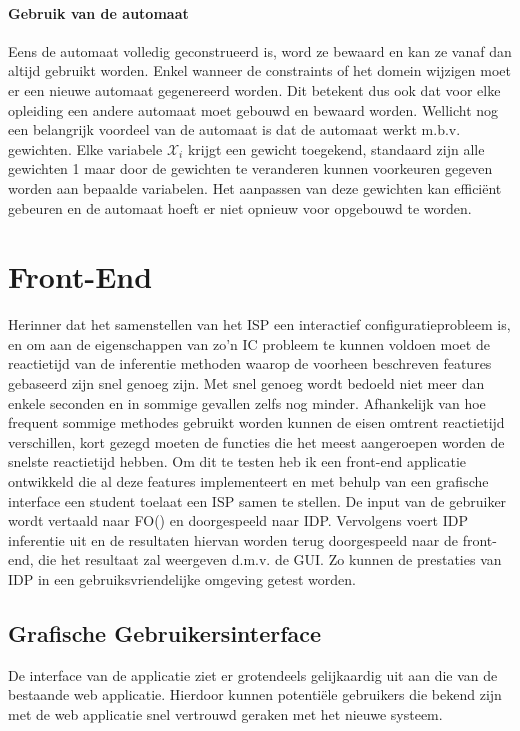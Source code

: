 \paragraph{Gebruik van de automaat}
Eens de automaat volledig geconstrueerd is, word ze bewaard en kan ze vanaf dan altijd gebruikt worden. Enkel wanneer de constraints of het domein wijzigen moet er een nieuwe automaat gegenereerd worden. Dit betekent dus ook dat voor elke opleiding een andere automaat moet gebouwd en bewaard worden. Wellicht nog een belangrijk voordeel van de automaat is dat de automaat werkt m.b.v. gewichten. Elke variabele $\mathcal{X}_{i}$ krijgt een gewicht toegekend, standaard zijn alle gewichten 1 maar door de gewichten te veranderen kunnen voorkeuren gegeven worden aan bepaalde variabelen. Het aanpassen van deze gewichten kan effici\"{e}nt gebeuren en de automaat hoeft er niet opnieuw voor opgebouwd te worden.

\section{Front-End}
Herinner dat het samenstellen van het ISP een interactief configuratieprobleem is, en om aan de eigenschappen van zo'n IC probleem te kunnen voldoen moet de reactietijd van de inferentie methoden waarop de voorheen beschreven features gebaseerd zijn snel genoeg zijn. Met snel genoeg wordt bedoeld niet meer dan enkele seconden en in sommige gevallen zelfs nog minder. Afhankelijk van hoe frequent sommige methodes gebruikt worden kunnen de eisen omtrent reactietijd verschillen, kort gezegd moeten de functies die het meest aangeroepen worden de snelste reactietijd hebben. Om dit te testen heb ik een front-end applicatie ontwikkeld die al deze features implementeert en met behulp van een grafische interface een student toelaat een ISP samen te stellen. De input van de gebruiker wordt vertaald naar FO(\textperiodcentered) en doorgespeeld naar IDP. Vervolgens voert IDP inferentie uit en de resultaten hiervan worden terug doorgespeeld naar de front-end, die het resultaat zal weergeven d.m.v. de GUI. Zo kunnen de prestaties van IDP in een gebruiksvriendelijke omgeving getest worden. 

\subsection{Grafische Gebruikersinterface}
De interface van de applicatie ziet er grotendeels gelijkaardig uit aan die van de bestaande web applicatie. Hierdoor kunnen potenti\"{e}le gebruikers die bekend zijn met de web applicatie snel vertrouwd geraken met het nieuwe systeem. 

